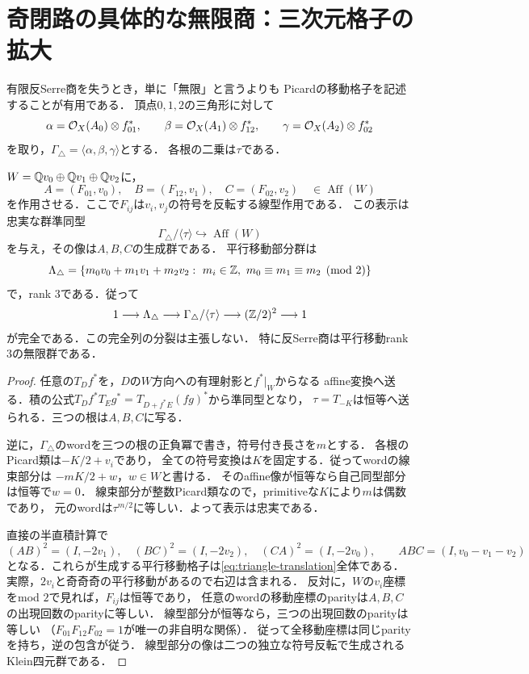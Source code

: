 \section{奇閉路の具体的な無限商：三次元格子の拡大}\label{sec:triangle-group}
有限反Serre商を失うとき，単に「無限」と言うよりも
Picardの移動格子を記述することが有用である．
頂点$0,1,2$の三角形に対して
\[
 \alpha=\mathcal O_X(A_0)\otimes f_{01}^*,\qquad
 \beta=\mathcal O_X(A_1)\otimes f_{12}^*,\qquad
 \gamma=\mathcal O_X(A_2)\otimes f_{02}^*
\]
を取り，$\Gamma_\triangle=\langle\alpha,\beta,\gamma\rangle$とする．
各根の二乗は$\tau$である．

\begin{proposition}[三角形の反Serre商の平行移動格子]\label{prop:triangle-lattice}
$W=\mathbb Q v_0\oplus\mathbb Q v_1\oplus\mathbb Q v_2$に，
\[
 A=(F_{01},v_0),\quad B=(F_{12},v_1),\quad C=(F_{02},v_2)
 \quad\in\operatorname{Aff}(W)
\]
を作用させる．ここで$F_{ij}$は$v_i,v_j$の符号を反転する線型作用である．
この表示は忠実な群準同型
\[
 \Gamma_\triangle/\langle\tau\rangle\hookrightarrow\operatorname{Aff}(W)
\]
を与え，その像は$A,B,C$の生成群である．
平行移動部分群は
\begin{equation}\label{eq:triangle-translation}
 \Lambda_\triangle
 =\{m_0v_0+m_1v_1+m_2v_2:\ m_i\in\Z,\ 
 m_0\equiv m_1\equiv m_2\pmod2\}
\end{equation}
で，rank $3$である．従って
\[
 1\longrightarrow\Lambda_\triangle
 \longrightarrow\Gamma_\triangle/\langle\tau\rangle
 \longrightarrow(\mathbb Z/2)^2\longrightarrow1
\]
が完全である．この完全列の分裂は主張しない．
特に反Serre商は平行移動rank $3$の無限群である．
\end{proposition}
\begin{proof}
任意の$T_Df^*$を，$D$の$W$方向への有理射影と$f^*|_W$からなる
affine変換へ送る．積の公式$T_Df^*T_Eg^*=T_{D+f^*E}(fg)^*$から準同型となり，
$\tau=T_{-K}$は恒等へ送られる．三つの根は$A,B,C$に写る．

逆に，$\Gamma_\triangle$のwordを三つの根の正負冪で書き，符号付き長さを$m$とする．
各根のPicard類は$-K/2+v_i$であり，
全ての符号変換は$K$を固定する．従ってwordの線束部分は
$-mK/2+w$，$w\in W$と書ける．
そのaffine像が恒等なら自己同型部分は恒等で$w=0$．
線束部分が整数Picard類なので，primitiveな$K$により$m$は偶数であり，
元のwordは$\tau^{m/2}$に等しい．よって表示は忠実である．

直接の半直積計算で
\[
 (AB)^2=(I,-2v_1),\quad
 (BC)^2=(I,-2v_2),\quad
 (CA)^2=(I,-2v_0),\qquad
 ABC=(I,v_0-v_1-v_2)
\]
となる．これらが生成する平行移動格子は\eqref{eq:triangle-translation}全体である．
実際，$2v_i$と奇奇奇の平行移動があるので右辺は含まれる．
反対に，$W$の$v_i$座標をmod $2$で見れば，$F_{ij}$は恒等であり，
任意のwordの移動座標のparityは$A,B,C$の出現回数のparityに等しい．
線型部分が恒等なら，三つの出現回数のparityは等しい
（$F_{01}F_{12}F_{02}=1$が唯一の非自明な関係）．
従って全移動座標は同じparityを持ち，逆の包含が従う．
線型部分の像は二つの独立な符号反転で生成されるKlein四元群である．
\end{proof}

